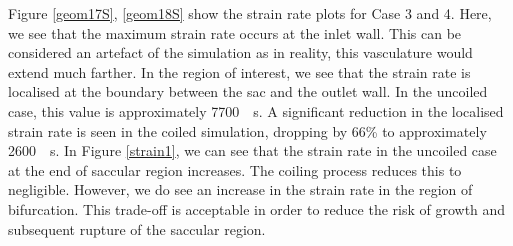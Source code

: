\documentclass[journal,twoside,web]{ieeecolor}
\begin{document}
Figure \ref{geom17S}, \ref{geom18S} show the strain rate plots for Case 3 and 4. Here, we see that the maximum strain rate occurs at the inlet wall. This can be considered an artefact of the simulation as in reality, this vasculature would extend much farther. In the region of interest, we see that the strain rate is localised at the boundary between the sac and the outlet wall. In the uncoiled case, this value is approximately \SI{7700}{\per\second}. A significant reduction in the localised strain rate is seen in the coiled simulation, dropping by 66\% to approximately \SI{2600}{\per\second}. In Figure \ref{strain1}, we can see that the strain rate in the uncoiled case at the end of saccular region increases. The coiling process reduces this to negligible. However, we do see an increase in the strain rate in the region of bifurcation. This trade-off is acceptable in order to reduce the risk of growth and subsequent rupture of the saccular region.
\end{document}
